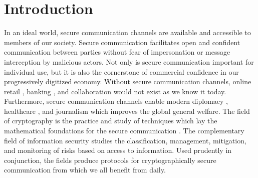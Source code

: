 \hypertarget{sec:introduction}{%
\chapter{Introduction}\label{sec:introduction}}

In an ideal world, secure communication channels are available and accessible to members of our society.
Secure communication facilitates open and confident communication between parties without fear of impersonation or message interception by malicious actors.
Not only is secure communication important for individual use, but it is also the cornerstone of commercial confidence in our progressively digitized economy.
Without secure communication channels, online retail \autocite{chen2010consumer, chakraborty2016online}, banking \autocite{karim2009towards,hisamatsu2010online}, and collaboration \autocite{JOSHI2017128} would not exist as we know it today.
Furthermore, secure communication channels enable modern diplomacy \autocite{pauletto2020information}, healthcare \autocite{doi:10.1080/17538157.2022.2049274, kuo2016secure}, and journalism \autocite{taylor2015need, di2022information} which improves the global general welfare.
The field of cryptography is the practice and study of techniques which lay the mathematical foundations for the secure communication \autocite{schneier2007applied}.
The complementary field of information security studies the classification, management, mitigation, and monitoring of risks \autocite{blakley2001information,anderson2003we} based on access to information.
Used prudently in conjunction, the fields produce protocols for cryptographically secure communication from which we all benefit from daily.

